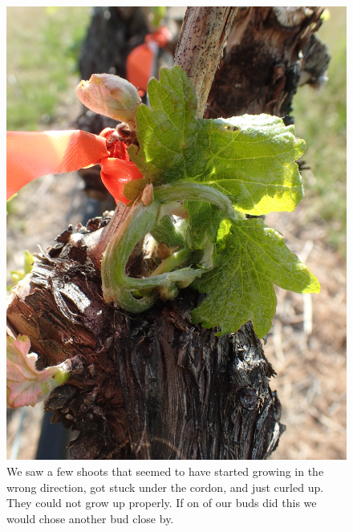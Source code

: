 \documentclass[11pt,letter]{article}
\begin{document}
\begin{figure}%
  \includegraphics[width=\linewidth]{CurledLeaf.jpg}
  \caption{We saw a few shoots that seemed to have started growing in the wrong direction, got stuck under the cordon, and just curled up. They could not grow up properly. If on of our buds did this we would chose another bud close by. }
  \label{fig:CurledLeaf}
\end{figure} 
\end{document}
